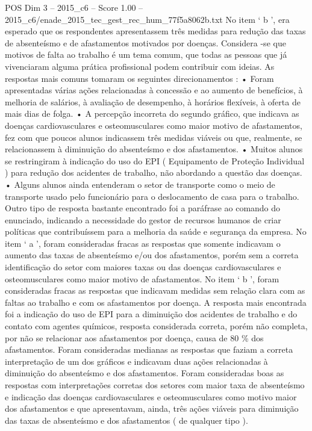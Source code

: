 \begin{textsample}{POS Dim 3 – 2015\_c6 – Score 1.00 – 2015\_c6/enade\_2015\_tec\_gest\_rec\_hum\_77f5a8062b.txt}
No item ‘ b ’, era esperado que os respondentes apresentassem três medidas para redução das taxas de absenteísmo e de afastamentos motivados por doenças.
Considera -se que motivos de falta ao trabalho é um tema comum, que todas as pessoas que já vivenciaram alguma prática profissional podem contribuir com ideias.
As respostas mais comuns tomaram os seguintes direcionamentos : • Foram apresentadas várias ações relacionadas à concessão e ao aumento de benefícios, à melhoria de salários, à avaliação de desempenho, à horários flexíveis, à oferta de mais dias de folga. • A percepção incorreta do segundo gráfico, que indicava as doenças cardiovasculares e osteomusculares como maior motivo de afastamentos, fez com que poucos alunos indicassem três medidas viáveis ou que, realmente, se relacionassem à diminuição do absenteísmo e dos afastamentos. • Muitos alunos se restringiram à indicação do uso do EPI ( Equipamento de Proteção Individual ) para redução dos acidentes de trabalho, não abordando a questão das doenças. • Alguns alunos ainda entenderam o setor de transporte como o meio de transporte usado pelo funcionário para o deslocamento de casa para o trabalho.  Outro tipo de resposta bastante encontrado foi a paráfrase ao comando do enunciado, indicando a necessidade do gestor de recursos humanos de criar políticas que contribuíssem para a melhoria da saúde e segurança da empresa.
No item ‘ a ’, foram consideradas fracas as respostas que somente indicavam o aumento das taxas de absenteísmo e/ou dos afastamentos, porém sem a correta identificação do setor com maiores taxas ou das doenças cardiovasculares e osteomusculares como maior motivo de afastamentos.
No item ‘ b ’, foram consideradas fracas as respostas que indicavam medidas sem relação clara com as faltas ao trabalho e com os afastamentos por doença.
A resposta mais encontrada foi a indicação do uso de EPI para a diminuição dos acidentes de trabalho e do contato com agentes químicos, resposta considerada correta, porém não completa, por não se relacionar aos afastamentos por doença, causa de 80 \% dos afastamentos.
Foram consideradas medianas as respostas que faziam a correta interpretação de um dos gráficos e indicavam duas ações relacionadas à diminuição do absenteísmo e dos afastamentos.
Foram consideradas boas as respostas com interpretações corretas dos setores com maior taxa de absenteísmo e indicação das doenças cardiovasculares e osteomusculares como motivo maior dos afastamentos e que apresentavam, ainda, três ações viáveis para diminuição das taxas de absenteísmo e dos afastamentos ( de qualquer tipo ).

\end{textsample}
